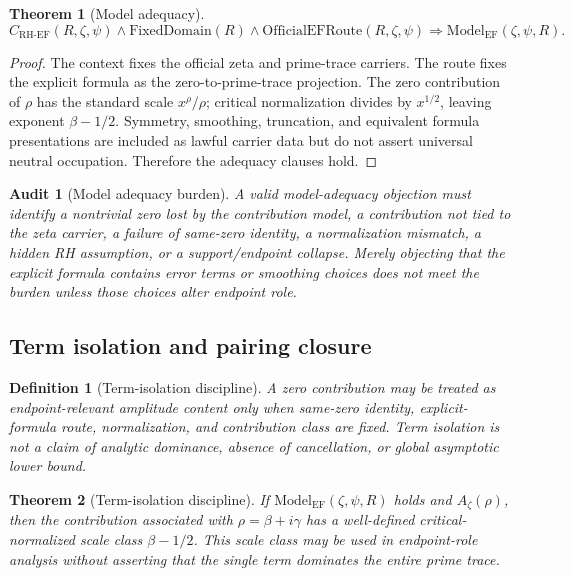 \documentclass[11pt]{article}
\newtheorem{definition}{Definition}[section]
\newtheorem{theorem}{Theorem}[section]
\newtheorem{audit}{Audit}[section]
\newcommand{\Az}{A_{\zeta}}
\newcommand{\FixedDomain}{\mathrm{FixedDomain}}
\newcommand{\CRHEF}{C_{\mathrm{RH}\text{-}\mathrm{EF}}}
\newcommand{\ModelEF}{\mathrm{Model}_{\mathrm{EF}}}
\newcommand{\OfficialEFRoute}{\mathrm{OfficialEFRoute}}
\begin{document}
\begin{theorem}[Model adequacy]
\[
\CRHEF(R,\zeta,\psi)\wedge \FixedDomain(R)\wedge \OfficialEFRoute(R,\zeta,\psi)
\Rightarrow \ModelEF(\zeta,\psi,R).
\]
\end{theorem}

\begin{proof}
The context fixes the official zeta and prime-trace carriers.  The route fixes the explicit formula as the zero-to-prime-trace projection.  The zero contribution of \(\rho\) has the standard scale \(x^\rho/\rho\); critical normalization divides by \(x^{1/2}\), leaving exponent \(\beta-1/2\).  Symmetry, smoothing, truncation, and equivalent formula presentations are included as lawful carrier data but do not assert universal neutral occupation.  Therefore the adequacy clauses hold.
\end{proof}

\begin{audit}[Model adequacy burden]
A valid model-adequacy objection must identify a nontrivial zero lost by the contribution model, a contribution not tied to the zeta carrier, a failure of same-zero identity, a normalization mismatch, a hidden RH assumption, or a support/endpoint collapse.  Merely objecting that the explicit formula contains error terms or smoothing choices does not meet the burden unless those choices alter endpoint role.
\end{audit}

\subsection{Term isolation and pairing closure}

\begin{definition}[Term-isolation discipline]
A zero contribution may be treated as endpoint-relevant amplitude content only when same-zero identity, explicit-formula route, normalization, and contribution class are fixed.  Term isolation is not a claim of analytic dominance, absence of cancellation, or global asymptotic lower bound.
\end{definition}

\begin{theorem}[Term-isolation discipline]
If \(\ModelEF(\zeta,\psi,R)\) holds and \(\Az(\rho)\), then the contribution associated with \(\rho=\beta+i\gamma\) has a well-defined critical-normalized scale class \(\beta-1/2\).  This scale class may be used in endpoint-role analysis without asserting that the single term dominates the entire prime trace.
\end{theorem}
\end{document}
